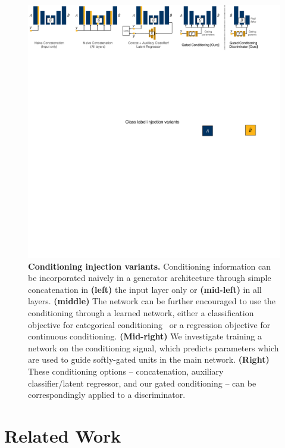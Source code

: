 \begin{figure}[t]
    \centering
    \includegraphics[width=\linewidth]{paper_images/arch_inject.pdf}
    \caption{{\bf Conditioning injection variants.}
    Conditioning information can be incorporated naively in a generator architecture through simple concatenation in {\bf (left)} the input layer only or {\bf (mid-left)} in all layers. {\bf (middle)} The network can be further encouraged to use the conditioning through a learned network, either a classification objective for categorical conditioning~\cite{XX,XX} or a regression objective for continuous conditioning. {\bf (Mid-right)} We investigate training a network on the conditioning signal, which predicts parameters which are used to guide softly-gated units in the main network. {\bf (Right)} These conditioning options -- concatenation, auxiliary classifier/latent regressor, and our gated conditioning -- can be correspondingly applied to a discriminator.\label{fig:arch-inj} }
\end{figure}

\section{Related Work}
